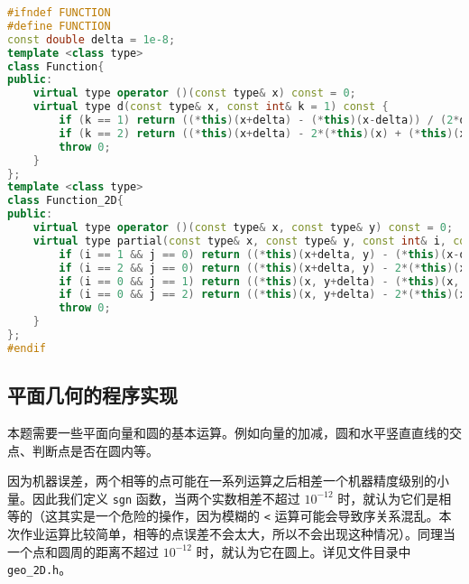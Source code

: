 \documentclass{ctexart}
\begin{document}
\begin{lstlisting}[language={c++}]
#ifndef FUNCTION
#define FUNCTION
const double delta = 1e-8;
template <class type>
class Function{
public:
	virtual type operator ()(const type& x) const = 0;
	virtual type d(const type& x, const int& k = 1) const {
		if (k == 1) return ((*this)(x+delta) - (*this)(x-delta)) / (2*delta);
		if (k == 2) return ((*this)(x+delta) - 2*(*this)(x) + (*this)(x-delta)) / (delta*delta);
		throw 0;
	}
};
template <class type>
class Function_2D{
public:
	virtual type operator ()(const type& x, const type& y) const = 0;
	virtual type partial(const type& x, const type& y, const int& i, const int& j) const {
		if (i == 1 && j == 0) return ((*this)(x+delta, y) - (*this)(x-delta, y)) / (2*delta);
		if (i == 2 && j == 0) return ((*this)(x+delta, y) - 2*(*this)(x, y) + (*this)(x-delta, y))/ (delta*delta);
		if (i == 0 && j == 1) return ((*this)(x, y+delta) - (*this)(x, y-delta)) / (2*delta);
		if (i == 0 && j == 2) return ((*this)(x, y+delta) - 2*(*this)(x, y) + (*this)(x, y-delta))/ (delta*delta);
		throw 0;
	}
};
#endif
\end{lstlisting}

\subsection{平面几何的程序实现}

本题需要一些平面向量和圆的基本运算。例如向量的加减，圆和水平竖直直线的交点、判断点是否在圆内等。

因为机器误差，两个相等的点可能在一系列运算之后相差一个机器精度级别的小量。因此我们定义 \verb|sgn| 函数，当两个实数相差不超过 $10^{-12}$ 时，就认为它们是相等的（这其实是一个危险的操作，因为模糊的 \verb|<| 运算可能会导致序关系混乱。本次作业运算比较简单，相等的点误差不会太大，所以不会出现这种情况）。同理当一个点和圆周的距离不超过 $10^{-12}$ 时，就认为它在圆上。详见文件目录中 \verb|geo_2D.h|。
\end{document}
